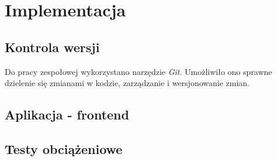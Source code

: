 \section{Implementacja}
\subsection{Kontrola wersji}
Do pracy zespołowej wykorzystano narzędzie \textit{Git}. Umożliwiło ono sprawne dzielenie się zmianami w kodzie, zarządzanie i wersjonowanie zmian.




\subsection{Aplikacja - frontend}


\subsection{Testy obciążeniowe}


